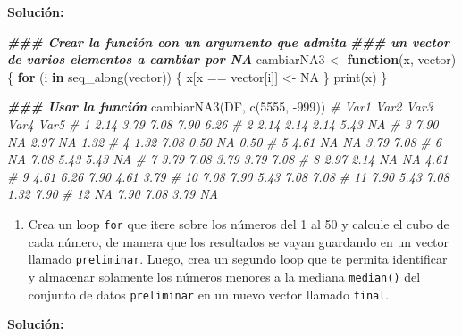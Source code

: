 \documentclass[
]{article}
\newenvironment{Shaded}{\begin{snugshade}}{\end{snugshade}}
\newcommand{\CommentTok}[1]{\textcolor[rgb]{0.56,0.35,0.01}{\textit{#1}}}
\newcommand{\ConstantTok}[1]{\textcolor[rgb]{0.00,0.00,0.00}{#1}}
\newcommand{\ControlFlowTok}[1]{\textcolor[rgb]{0.13,0.29,0.53}{\textbf{#1}}}
\newcommand{\DecValTok}[1]{\textcolor[rgb]{0.00,0.00,0.81}{#1}}
\newcommand{\DocumentationTok}[1]{\textcolor[rgb]{0.56,0.35,0.01}{\textbf{\textit{#1}}}}
\newcommand{\FunctionTok}[1]{\textcolor[rgb]{0.00,0.00,0.00}{#1}}
\newcommand{\NormalTok}[1]{#1}
\newcommand{\OtherTok}[1]{\textcolor[rgb]{0.56,0.35,0.01}{#1}}
\newcommand{\SpecialCharTok}[1]{\textcolor[rgb]{0.00,0.00,0.00}{#1}}
\providecommand{\tightlist}{%
  \setlength{\itemsep}{0pt}\setlength{\parskip}{0pt}}
\theoremstyle{definition}
\theoremstyle{definition}
\theoremstyle{definition}
\theoremstyle{definition}
\theoremstyle{remark}
\begin{document}
\textbf{Solución:}

\begin{Shaded}
\begin{Highlighting}[]
\DocumentationTok{\#\#\# Crear la función con un argumento que admita }
\DocumentationTok{\#\#\# un vector de varios elementos a cambiar por NA}
\NormalTok{cambiarNA3 }\OtherTok{\textless{}{-}} \ControlFlowTok{function}\NormalTok{(x, vector) \{}
  \ControlFlowTok{for}\NormalTok{ (i }\ControlFlowTok{in} \FunctionTok{seq\_along}\NormalTok{(vector)) \{}
\NormalTok{    x[x }\SpecialCharTok{==}\NormalTok{ vector[i]] }\OtherTok{\textless{}{-}} \ConstantTok{NA}
\NormalTok{  \}}
  \FunctionTok{print}\NormalTok{(x)}
\NormalTok{\}}

\DocumentationTok{\#\#\# Usar la función}
\FunctionTok{cambiarNA3}\NormalTok{(DF, }\FunctionTok{c}\NormalTok{(}\DecValTok{5555}\NormalTok{, }\SpecialCharTok{{-}}\DecValTok{999}\NormalTok{))}
\CommentTok{\#    Var1 Var2 Var3 Var4 Var5}
\CommentTok{\# 1  2.14 3.79 7.08 7.90 6.26}
\CommentTok{\# 2  2.14 2.14 2.14 5.43   NA}
\CommentTok{\# 3  7.90   NA 2.97   NA 1.32}
\CommentTok{\# 4  1.32 7.08 0.50   NA 0.50}
\CommentTok{\# 5  4.61   NA   NA 3.79 7.08}
\CommentTok{\# 6    NA 7.08 5.43 5.43   NA}
\CommentTok{\# 7  3.79 7.08 3.79 3.79 7.08}
\CommentTok{\# 8  2.97 2.14   NA   NA 4.61}
\CommentTok{\# 9  4.61 6.26 7.90 4.61 3.79}
\CommentTok{\# 10 7.08 7.90 5.43 7.08 7.08}
\CommentTok{\# 11 7.90 5.43 7.08 1.32 7.90}
\CommentTok{\# 12   NA 7.90 7.08 3.79   NA}
\end{Highlighting}
\end{Shaded}

\begin{enumerate}
\def\labelenumi{\arabic{enumi}.}
\tightlist
\item
  Crea un loop \texttt{for} que itere sobre los números del 1 al 50 y calcule el cubo de cada número, de manera que los resultados se vayan guardando en un vector llamado \texttt{preliminar}. Luego, crea un segundo loop que te permita identificar y almacenar solamente los números menores a la mediana \texttt{median()} del conjunto de datos \texttt{preliminar} en un nuevo vector llamado \texttt{final}.
\end{enumerate}

\textbf{Solución:}
\end{document}
